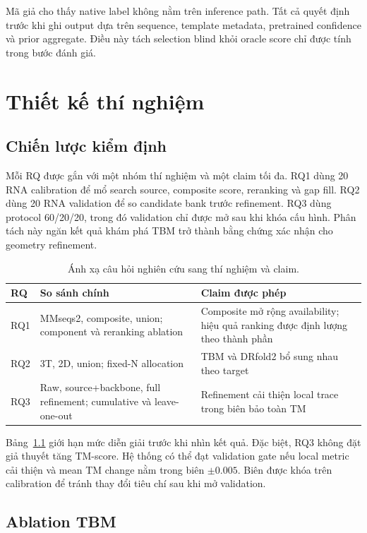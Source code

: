\documentclass[12pt,a4paper,oneside]{report}
\begin{document}
Mã giả cho thấy native label không nằm trên inference path. Tất cả quyết định trước khi
ghi output dựa trên sequence, template metadata, pretrained confidence và prior aggregate.
Điều này tách selection blind khỏi oracle score chỉ được tính trong bước đánh giá.

\chapter{Thiết kế thí nghiệm}
\label{chap:experiment_vi}

\section{Chiến lược kiểm định}

Mỗi RQ được gắn với một nhóm thí nghiệm và một claim tối đa. RQ1 dùng 20 RNA calibration
để mổ search source, composite score, reranking và gap fill. RQ2 dùng 20 RNA validation
để so candidate bank trước refinement. RQ3 dùng protocol 60/20/20, trong đó validation
chỉ được mở sau khi khóa cấu hình. Phân tách này ngăn kết quả khám phá TBM trở thành bằng
chứng xác nhận cho geometry refinement.

\begin{table}[H]
\centering
\caption{Ánh xạ câu hỏi nghiên cứu sang thí nghiệm và claim.}
\label{tab:rq_map_vi}
\begin{tabularx}{\textwidth}{p{1.0cm}X X}
\toprule
RQ & So sánh chính & Claim được phép \\
\midrule
RQ1 & MMseqs2, composite, union; component và reranking ablation & Composite mở rộng availability; hiệu quả ranking được định lượng theo thành phần \\
RQ2 & 3T, 2D, union; fixed-N allocation & TBM và DRfold2 bổ sung nhau theo target \\
RQ3 & Raw, source+backbone, full refinement; cumulative và leave-one-out & Refinement cải thiện local trace trong biên bảo toàn TM \\
\bottomrule
\end{tabularx}
\end{table}

Bảng~\ref{tab:rq_map_vi} giới hạn mức diễn giải trước khi nhìn kết quả. Đặc biệt, RQ3
không đặt giả thuyết tăng TM-score. Hệ thống có thể đạt validation gate nếu local metric
cải thiện và mean TM change nằm trong biên $\pm0.005$. Biên được khóa trên calibration
để tránh thay đổi tiêu chí sau khi mở validation.

\section{Ablation TBM}
\end{document}
